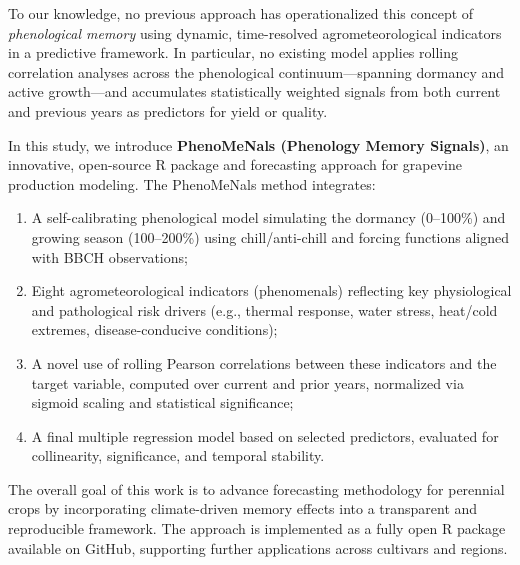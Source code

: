 \documentclass[
  letterpaper,
  DIV=11,
  numbers=noendperiod]{scrartcl}
\begin{document}
To our knowledge, no previous approach has operationalized this concept
of \emph{phenological memory} using dynamic, time-resolved
agrometeorological indicators in a predictive framework. In particular,
no existing model applies rolling correlation analyses across the
phenological continuum---spanning dormancy and active growth---and
accumulates statistically weighted signals from both current and
previous years as predictors for yield or quality.

In this study, we introduce \textbf{PhenoMeNals (Phenology Memory
Signals)}, an innovative, open-source R package and forecasting approach
for grapevine production modeling. The PhenoMeNals method integrates:

\begin{enumerate}
\def\labelenumi{\arabic{enumi}.}
\item
  A self-calibrating phenological model simulating the dormancy
  (0--100\%) and growing season (100--200\%) using chill/anti-chill and
  forcing functions aligned with BBCH observations;
\item
  Eight agrometeorological indicators (phenomenals) reflecting key
  physiological and pathological risk drivers (e.g., thermal response,
  water stress, heat/cold extremes, disease-conducive conditions);
\item
  A novel use of rolling Pearson correlations between these indicators
  and the target variable, computed over current and prior years,
  normalized via sigmoid scaling and statistical significance;
\item
  A final multiple regression model based on selected predictors,
  evaluated for collinearity, significance, and temporal stability.
\end{enumerate}

The overall goal of this work is to advance forecasting methodology for
perennial crops by incorporating climate-driven memory effects into a
transparent and reproducible framework. The approach is implemented as a
fully open R package available on GitHub, supporting further
applications across cultivars and regions.
\end{document}
